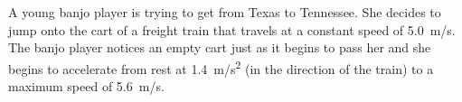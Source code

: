 \question A young banjo player is trying to get from Texas to Tennessee. She decides to jump onto the cart of a freight train that travels at a constant speed of \SI{5.0}{m/s}. The banjo player notices an empty cart just as it begins to pass her and she begins to accelerate from rest at \SI{1.4}{m/s^2} (in the direction of the train) to a maximum speed of \SI{5.6}{m/s}.

